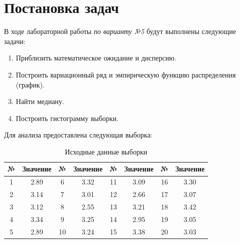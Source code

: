 \section{Постановка задач}

В ходе лабораторной работы \textit{по варианту №5} будут выполнены следующие задачи:

\begin{enumerate}
  \item Приблизить математическое ожидание и дисперсию.
  \item Построить вариационный ряд и эмпирическую функцию распределения (график).
  \item Найти медиану.
  \item Построить гистограмму выборки.
\end{enumerate}

Для анализа предоставлена следующая выборка:

\begin{table}[h!]
\centering
\begin{tabular}{|c|c||c|c||c|c||c|c|}
\hline
№ & Значение & № & Значение & № & Значение & № & Значение \\ \hline \hline
1 & 2.89 & 6  & 3.32 & 11 & 3.09 & 16 & 3.30 \\ \hline
2 & 3.14 & 7  & 3.01 & 12 & 2.66 & 17 & 3.07 \\ \hline
3 & 3.12 & 8  & 2.55 & 13 & 3.21 & 18 & 3.42 \\ \hline
4 & 3.34 & 9  & 3.25 & 14 & 2.95 & 19 & 3.05 \\ \hline
5 & 2.89 & 10 & 3.24 & 15 & 3.38 & 20 & 3.03 \\ \hline
\end{tabular}
\caption{Исходные данные выборки}
\end{table}